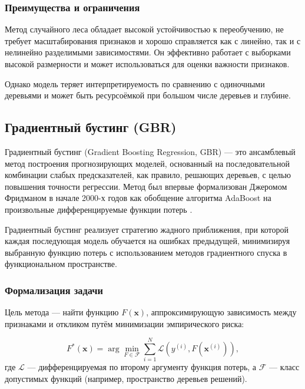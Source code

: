 \subsubsection{Преимущества и ограничения}

Метод случайного леса обладает высокой устойчивостью к переобучению, не требует масштабирования признаков и хорошо справляется как с линейно, так и с нелинейно разделимыми зависимостями. Он эффективно работает с выборками высокой размерности и может использоваться для оценки важности признаков.

Однако модель теряет интерпретируемость по сравнению с одиночными деревьями и может быть ресурсоёмкой при большом числе деревьев и глубине.

\subsection{Градиентный бустинг (GBR)} \label{ch1:methods:gbr}

Градиентный бустинг (Gradient Boosting Regression, GBR) --- это ансамблевый метод построения прогнозирующих моделей, основанный на последовательной комбинации слабых предсказателей, как правило, решающих деревьев, с целью повышения точности регрессии. Метод был впервые формализован Джеромом Фридманом в начале 2000-х годов как обобщение алгоритма AdaBoost на произвольные дифференцируемые функции потерь \cite{friedman2001}.

Градиентный бустинг реализует стратегию жадного приближения, при которой каждая последующая модель обучается на ошибках предыдущей, минимизируя выбранную функцию потерь с использованием методов градиентного спуска в функциональном пространстве.

\subsubsection{Формализация задачи}

Цель метода --- найти функцию $F(\mathbf{x})$, аппроксимирующую зависимость между признаками и откликом путём минимизации эмпирического риска:

\begin{equation}
F^*(\mathbf{x}) = \arg\min_{F \in \mathcal{F}} \sum_{i=1}^{N} \mathcal{L}(y^{(i)}, F(\mathbf{x}^{(i)})),
\end{equation}
где $\mathcal{L}$ — дифференцируемая по второму аргументу функция потерь, а $\mathcal{F}$ — класс допустимых функций (например, пространство деревьев решений).

